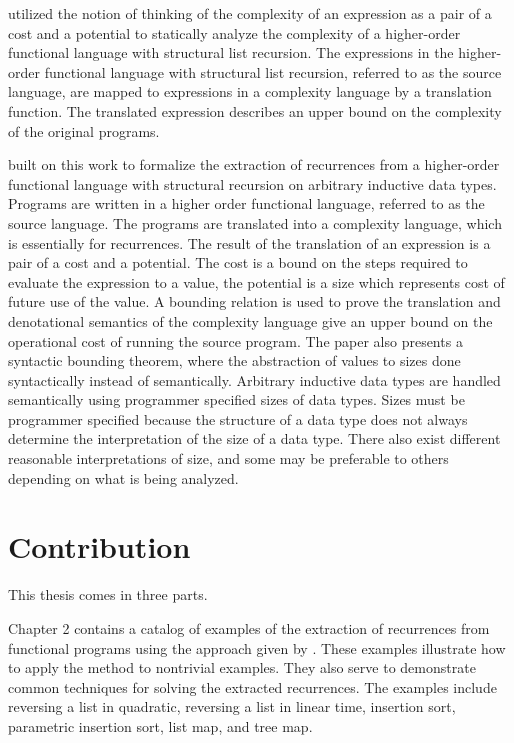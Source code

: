 \citet{Danner2013} utilized the notion of thinking of the complexity of an
expression as a pair of a cost and a potential to statically analyze the
complexity of a higher-order functional language with structural list
recursion.  The expressions in the higher-order functional language with
structural list recursion, referred to as the source language, are mapped to
expressions in a complexity language by a translation function.  The translated
expression describes an upper bound on the complexity of the original programs.



\citet{Danner2015} built on this work to formalize the extraction
of recurrences from a higher-order functional language with structural
recursion on arbitrary inductive data types. Programs are written in a higher
order functional language, referred to as the source language. The programs are
translated into a complexity language, which is essentially for recurrences.
The result of the translation of an expression is a pair of a cost and a
potential. The cost is a bound on the steps required to evaluate the expression
to a value, the potential is a size which represents cost of future use of the
value. A bounding relation is used to prove the translation and denotational
semantics of the complexity language give an upper bound on the operational
cost of running the source program. The paper also presents a syntactic
bounding theorem, where the abstraction of values to sizes done syntactically
instead of semantically.  Arbitrary inductive data types are handled
semantically using programmer specified sizes of data types. Sizes must be
programmer specified because the structure of a data type does not always
determine the interpretation of the size of a data type. There also exist
different reasonable interpretations of size, and some may be preferable to
others depending on what is being analyzed.


\section{Contribution}

This thesis comes in three parts.



Chapter 2 contains a catalog of examples of the extraction of recurrences
from functional programs using the approach given by \citet{Danner2015}. These
examples illustrate how to apply the method to nontrivial examples. They also
serve to demonstrate common techniques for solving the extracted recurrences.
The examples include reversing a list in quadratic, reversing a list in linear
time, insertion sort, parametric insertion sort, list map, and tree map.



